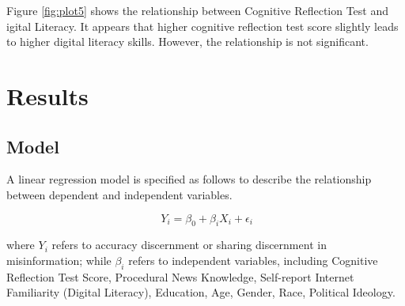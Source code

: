 \documentclass[
]{article}
\begin{document}
Figure \label{fig:plot5} \ref{fig:plot5} shows the relationship between Cognitive Reflection Test and igital Literacy. It appears that higher cognitive reflection test score slightly leads to higher digital literacy skills. However, the relationship is not significant.

\hypertarget{results}{%
\section{Results}\label{results}}

\hypertarget{model}{%
\subsection{Model}\label{model}}

A linear regression model is specified as follows to describe the relationship between dependent and independent variables.

\[
\ Y_i = \beta_0+ \beta_{i} X_{i}+ \epsilon_i
\]

where \(Y_i\) refers to accuracy discernment or sharing discernment in misinformation; while \(\beta_i\) refers to independent variables, including Cognitive Reflection Test Score, Procedural News Knowledge, Self-report Internet Familiarity (Digital Literacy), Education, Age, Gender, Race, Political Ideology.
\end{document}
